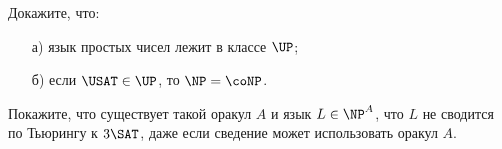 \begin{ptask}{57}
    Докажите, что: 
    \begin{enumerate}[topsep = 0pt, itemsep = -1ex]
        \item [а)] язык простых чисел лежит в классе $\UP$;
        \item [б)] если $\USAT \in \UP$, то $\NP = \coNP$.
    \end{enumerate}
\end{ptask}

\begin{ptask}{58}
    Покажите, что существует такой оракул $A$ и язык $L \in \NP^A$, что $L$ не
    сводится по Тьюрингу к $3\SAT$, даже если сведение может использовать оракул $A$.
\end{ptask}